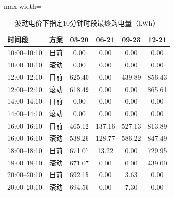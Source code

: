 \documentclass[UTF8,a4paper,zihao=-4,fontset=windows]{ctexart}
\begin{document}
\begin{table}[H]\centering\caption{波动电价下指定10分钟时段最终购电量（kWh）}
\fontsize{9.5}{12}\selectfont\setlength{\tabcolsep}{4pt}\renewcommand{\arraystretch}{1.12}
\begin{adjustbox}{max width=\linewidth}\begin{tabular}{lccccc}\toprule
时间段 & 方案 & 03-20 & 06-21 & 09-23 & 12-21\\\midrule
10:00–10:10 & 日前 & 0.00 & 0.00 & 0.00 & 0.00\\
10:00–10:10 & 滚动 & 0.00 & 0.00 & 0.00 & 0.00\\
12:00–12:10 & 日前 & 625.40 & 0.00 & 439.89 & 856.43\\
12:00–12:10 & 滚动 & 618.49 & 0.00 & 0.00 & 865.61\\
14:00–14:10 & 日前 & 0.00 & 0.00 & 0.00 & 0.00\\
14:00–14:10 & 滚动 & 0.00 & 0.00 & 0.00 & 0.00\\
16:00–16:10 & 日前 & 465.12 & 137.16 & 527.13 & 813.89\\
16:00–16:10 & 滚动 & 538.26 & 128.77 & 586.22 & 847.49\\
18:00–18:10 & 日前 & 671.07 & 13.22 & 0.00 & 729.95\\
18:00–18:10 & 滚动 & 671.07 & 0.00 & 0.00 & 439.00\\
20:00–20:10 & 日前 & 692.15 & 0.00 & 3.63 & 0.00\\
20:00–20:10 & 滚动 & 694.56 & 0.00 & 7.30 & 0.00\\
\bottomrule\end{tabular}\end{adjustbox}\end{table}
\end{document}
